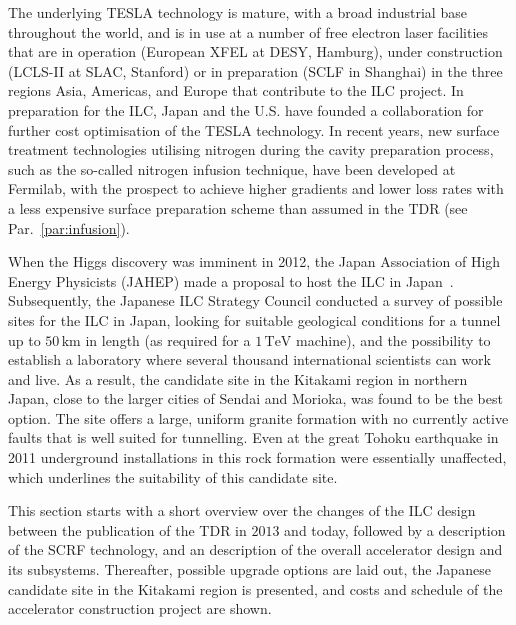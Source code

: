 The underlying TESLA technology is mature, with a broad industrial base throughout the world, and is in use at a number of free electron laser facilities that are in operation (European XFEL at DESY, Hamburg), under construction (LCLS-II at SLAC, Stanford) or in preparation (SCLF in Shanghai) in the three regions Asia, Americas, and Europe that contribute to the ILC project.
In preparation for the ILC, Japan and the U.S. have founded a collaboration for further cost optimisation of the TESLA technology.
In recent years, new surface treatment technologies utilising nitrogen during the cavity preparation process, such as the so-called   nitrogen infusion technique, have been developed at Fermilab, with the prospect to achieve higher gradients and lower loss rates with a less expensive surface preparation scheme than assumed in the TDR (see Par.~\ref{par:infusion}).

When the Higgs discovery was imminent in 2012, the Japan Association of High Energy Physicists (JAHEP) made a proposal to host the ILC in Japan~\cite{JAHEP:2012a,JAHEP:2012b}. 
Subsequently, the Japanese ILC Strategy Council conducted a survey of possible sites for the ILC in Japan, looking for  suitable geological conditions for a tunnel up to $50\,{\mathrm{km}}$ in length (as required for a $1\,{\mathrm{TeV}}$  machine), and the possibility to establish a laboratory where several thousand international scientists can work and live. 
As a result, the candidate site in the Kitakami region in northern Japan, close to the larger cities of Sendai and Morioka, was found to be the best option. 
The site offers a large, uniform granite formation with no currently active faults that is well suited for tunnelling.
Even at the great Tohoku earthquake in 2011 underground installations in this rock formation were essentially unaffected, which underlines the suitability of this candidate site. 

This section starts with a short overview over the changes of the ILC design between the publication of the TDR in $2013$ and today, followed by a description of the SCRF technology, and an description of the overall accelerator design and its subsystems. 
Thereafter, possible upgrade options are laid out, the Japanese candidate site in the Kitakami region is presented, and costs and schedule of the accelerator construction project are shown.


